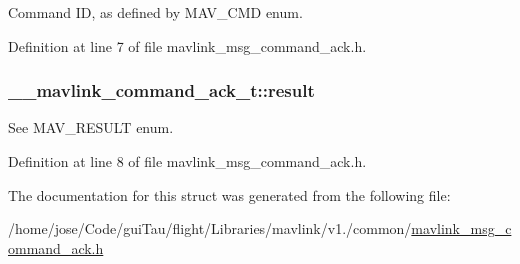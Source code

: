 Command I\-D, as defined by M\-A\-V\-\_\-\-C\-M\-D enum. 



Definition at line 7 of file mavlink\-\_\-msg\-\_\-command\-\_\-ack.\-h.

\hypertarget{struct____mavlink__command__ack__t_ae8165e8e4f7a1438977e1a7edd646b69}{
\subsubsection[{result}]{ \-\_\-\-\_\-mavlink\-\_\-command\-\_\-ack\-\_\-t\-::result}}\label{struct____mavlink__command__ack__t_ae8165e8e4f7a1438977e1a7edd646b69}


See M\-A\-V\-\_\-\-R\-E\-S\-U\-L\-T enum. 



Definition at line 8 of file mavlink\-\_\-msg\-\_\-command\-\_\-ack.\-h.



The documentation for this struct was generated from the following file\-:\begin{DoxyCompactItemize}
\item 
/home/jose/\-Code/gui\-Tau/flight/\-Libraries/mavlink/v1./common/\hyperlink{mavlink__msg__command__ack_8h}{mavlink\-\_\-msg\-\_\-command\-\_\-ack.\-h}\end{DoxyCompactItemize}
